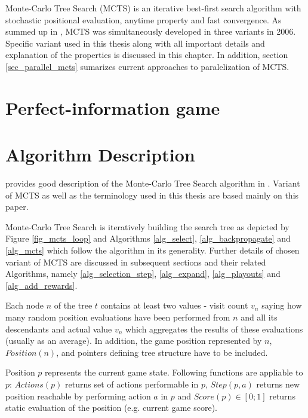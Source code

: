 Monte-Carlo Tree Search (MCTS) is an iterative best-first search algorithm with stochastic positional
evaluation, anytime property and fast convergence. As \citeauthor{ChaslotPhd2010} summed up in 
\cite{ChaslotPhd2010}, MCTS was simultaneously developed
in three variants \cites{Chaslot2006}{Coulom2006}{Kocsis2006} in 2006. Specific variant used in
this thesis along with all important details and explanation of the properties is discussed in this
chapter. In addition, section \ref{sec_parallel_mcts} sumarizes current approaches to paralelization
of MCTS.

\section{Perfect-information game}


\section{Algorithm Description}

\citeauthor{Chaslot2008} provides good description of the Monte-Carlo Tree Search algorithm in
\cite{Chaslot2008}. Variant of MCTS as well as the terminology used in this thesis are based mainly
on this paper.


Monte-Carlo Tree Search is iteratively building the search tree as depicted by Figure
\ref{fig_mcts_loop} and Algorithms \ref{alg_select}, \ref{alg_backpropagate} and \ref{alg_mcts}
which follow the algorithm in its generality. Further details of chosen variant of MCTS
are discussed in subsequent sections and their related Algorithms, namely \ref{alg_selection_step},
\ref{alg_expand}, \ref{alg_playouts} and \ref{alg_add_rewards}.

Each node $n$ of the tree $t$ contains at least two values - visit count $v_n$
saying how many random position evaluations have been performed from $n$ and all its
descendants and
actual value $v_n$ which aggregates the results of these evaluations (usually as an average).
In addition, the game position represented by $n$, $Position(n)$, and pointers defining
tree structure have to be included. 

Position $p$ represents the current game state. Following
functions are appliable to $p$: $Actions(p)$ returns set of actions performable in $p$,
$Step(p, a)$ returns new position reachable by performing action $a$ in $p$ and $Score(p) \in
[0;1]$ returns static evaluation of the position (e.g. current game score).

